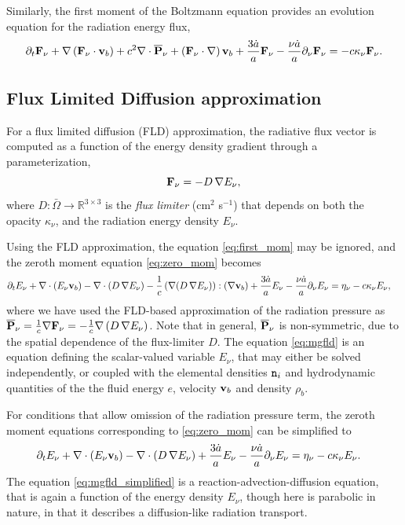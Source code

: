 \documentclass[10pt]{article}
\renewcommand{\(}{\left(}
\renewcommand{\)}{\right)}
\newcommand{\vb}{{\bf v}_b}
\newcommand{\Omegabar}{\bar{\Omega}}
\newcommand{\adot}{\dot{a}}
\newcommand{\rhob}{\rho_b}
\newcommand{\Enu}{E_{\nu}}
\newcommand{\Fnu}{{\bf F}_{\nu}}
\newcommand{\Pnu}{\overline{\bf P}_{\nu}}
\newcommand{\R}{\mathbb{R}}
\newcommand{\mn}{{\tt n}}
\begin{document}
Similarly, the first moment of the Boltzmann equation provides an
evolution equation for the radiation energy flux,
\begin{equation}
\label{eq:first_mom}
  \partial_{t} \Fnu + \nabla\(\Fnu\cdot\vb\) 
    + c^2 \nabla\cdot\Pnu + \(\Fnu\cdot\nabla\)\vb
    + \frac{3 \adot}{a} \Fnu - \frac{\nu \adot}{a}\partial_{\nu} \Fnu
  = -c \kappa_{\nu} \Fnu.
\end{equation}



\subsection{Flux Limited Diffusion approximation}
\label{subsec:fld_approx}

For a flux limited diffusion (FLD) approximation, the radiative flux
vector is computed as a function of the energy density gradient through
a parameterization, 
\begin{equation}
\label{eq:fld_approx}
  \Fnu = -D\,\nabla\Enu,
\end{equation}
where $D:\Omegabar\rightarrow\R^{3\times3}$ is the {\em flux limiter}
(cm$^2$ s$^{-1}$) that depends on both the opacity $\kappa_\nu$, and
the radiation energy density $\Enu$.

Using the FLD approximation, the equation \eqref{eq:first_mom} may be
ignored, and the zeroth moment equation \eqref{eq:zero_mom} becomes
\begin{equation}
\label{eq:mgfld}
\begin{split}
   \partial_{t} \Enu &+ \nabla\cdot(\Enu\vb) 
     - \nabla\cdot(D\,\nabla\Enu)
     - \frac{1}{c}\(\nabla(D\,\nabla\Enu)\):(\nabla\vb) 
     + \frac{3 \adot}{a} \Enu - \frac{\nu \adot}{a}\partial_{\nu}\Enu 
   = \eta_{\nu} - c \kappa_{\nu} \Enu,
\end{split}
\end{equation}
where we have used the FLD-based approximation of the radiation
pressure as $\Pnu = \frac{1}{c}\nabla\Fnu =
-\frac{1}{c}\nabla\(D\,\nabla\Enu\)$.  Note that in general, $\Pnu$ is  
non-symmetric, due to the spatial dependence of the flux-limiter $D$.
The equation \eqref{eq:mgfld} is an equation defining the
scalar-valued variable $\Enu$, that may either be solved
independently, or coupled with the elemental densities $\mn_i$ and
hydrodynamic quantities of the the fluid energy $e$, velocity
$\vb$ and density $\rhob$.

For conditions that allow omission of the radiation pressure term, the
zeroth moment equations corresponding to \eqref{eq:zero_mom} can be
simplified to
\begin{align}
  \label{eq:mgfld_simplified}
  &\partial_{t} \Enu + \nabla\cdot(\Enu\vb) 
    - \nabla\cdot(D\,\nabla\Enu) 
     + \frac{3 \adot}{a} \Enu - \frac{\nu \adot}{a}\partial_{\nu}\Enu
    = \eta_{\nu} - c \kappa_{\nu} \Enu.
\end{align}
The equation \eqref{eq:mgfld_simplified} is a
reaction-advection-diffusion equation, that is again a function of the
energy density $\Enu$, though here is parabolic in nature, in that it
describes a diffusion-like radiation transport.  
\end{document}
